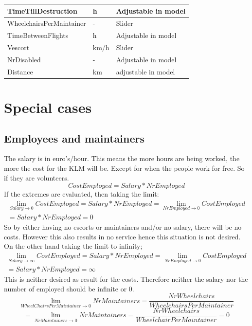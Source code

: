 \documentclass[a4paper, 11pt, notitlepage]{report}
\begin{document}
\begin{table}[h]
\begin{tabular}{|l|l|l|}
TimeTillDestruction      & h        & Adjustable in model
\\ \hline
WheelchairsPerMaintainer & -        & Slider                                                             \\ \hline
TimeBetweenFlights       & h        & Adjustable in model
\\ \hline
Vescort                  & km/h     & Slider                                                             \\ \hline
NrDisabled               & -        & Adjustable in model
\\ \hline
Distance                 & km       & adjustable in model                                                             \\ \hline
\end{tabular}
\end{table}
\chapter{Special cases}
\section{Employees and maintainers}
The salary is in euro's/hour. This means the more hours are being worked, the more the cost for the KLM will be. Except for when the people work for free. So if they are volunteers.\\
\begin{equation}
CostEmployed = Salary * NrEmployed
\end{equation}
If the extremes are evaluated, then taking the limit:
\begin{multline}
\lim_{Salary \rightarrow 0}CostEmployed = Salary * NrEmployed = \lim_{NrEmployed \rightarrow 0}CostEmployed \\ = Salary * NrEmployed = 0
\end{multline}
So by either having no escorts or maintainers and/or no salary, there will be no costs. However this also results in no service hence this situation is not desired. On the other hand taking the limit to infinity;
\begin{multline}
\lim_{Salary \rightarrow \infty} CostEmployed = Salary * NrEmployed = \lim_{NrEmployed \rightarrow 0} CostEmployed \\ = Salary * NrEmployed = \infty
\end{multline}
This is neither desired as result for the costs. Therefore neither the salary nor the number of employed should be infinite or 0.
\begin{equation}
\lim_{WheelChairsPerMaintainer \rightarrow 0} NrMaintainers = \frac{NrWheelchairs}{WheelchairsPerMaintainer}
\end{equation}
\begin{equation}
= \lim_{NrMaintainers \rightarrow 0}NrMaintainers = \frac{NrWheelchairs}{WheelchairPerMaintainer} = 0
\end{equation}
\end{document}

